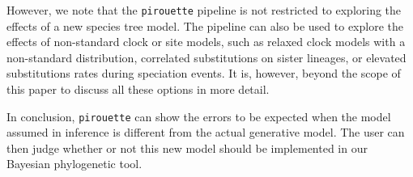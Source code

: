 However, we note that the \verb;pirouette; pipeline is not restricted 
to exploring the effects of a new species tree model. 
The pipeline can also be used to explore the effects of non-standard 
clock or site models, such as relaxed clock models with a non-standard 
distribution, correlated substitutions on sister lineages, or elevated 
substitutions rates during speciation events. 
It is, however, beyond the scope of this paper to discuss all these options 
in more detail.

In conclusion, \verb;pirouette; can show the errors to be expected
when the model assumed in inference is different from the 
actual generative model.
The user can then judge whether or not this new model 
should be implemented in our Bayesian phylogenetic tool. 




